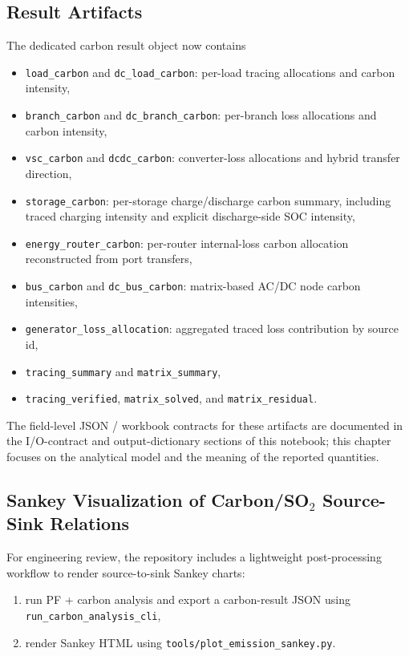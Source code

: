 \subsection{Result Artifacts}

The dedicated carbon result object now contains
\begin{itemize}
  \item \texttt{load\_carbon} and \texttt{dc\_load\_carbon}: per-load tracing allocations and carbon intensity,
  \item \texttt{branch\_carbon} and \texttt{dc\_branch\_carbon}: per-branch loss allocations and carbon intensity,
  \item \texttt{vsc\_carbon} and \texttt{dcdc\_carbon}: converter-loss allocations and hybrid transfer direction,
  \item \texttt{storage\_carbon}: per-storage charge/discharge carbon summary, including traced charging intensity and explicit discharge-side SOC intensity,
  \item \texttt{energy\_router\_carbon}: per-router internal-loss carbon allocation reconstructed from port transfers,
  \item \texttt{bus\_carbon} and \texttt{dc\_bus\_carbon}: matrix-based AC/DC node carbon intensities,
  \item \texttt{generator\_loss\_allocation}: aggregated traced loss contribution by source id,
  \item \texttt{tracing\_summary} and \texttt{matrix\_summary},
  \item \texttt{tracing\_verified}, \texttt{matrix\_solved}, and \texttt{matrix\_residual}.
\end{itemize}

The field-level JSON / workbook contracts for these artifacts are documented in
the I/O-contract and output-dictionary sections of this notebook; this chapter
focuses on the analytical model and the meaning of the reported quantities.

\subsection{Sankey Visualization of Carbon/SO\texorpdfstring{$_2$}{2} Source-Sink Relations}

For engineering review, the repository includes a lightweight post-processing
workflow to render source-to-sink Sankey charts:
\begin{enumerate}
  \item run PF + carbon analysis and export a carbon-result JSON using \texttt{run\_carbon\_analysis\_cli},
  \item render Sankey HTML using \texttt{tools/plot\_emission\_sankey.py}.
\end{enumerate}

